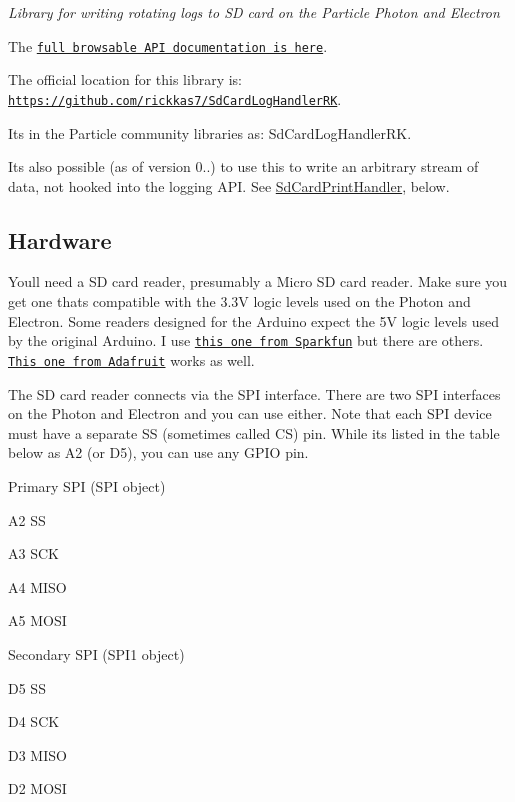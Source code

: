 {\itshape Library for writing rotating logs to SD card on the Particle Photon and Electron}

The \href{http://rickkas7.github.io/SdCardLogHandlerRK/}{\tt full browsable A\+PI documentation is here}.

The official location for this library is\+: \href{https://github.com/rickkas7/SdCardLogHandlerRK}{\tt https\+://github.\+com/rickkas7/\+Sd\+Card\+Log\+Handler\+RK}.

It\textquotesingle{}s in the Particle community libraries as\+: Sd\+Card\+Log\+Handler\+RK.

It\textquotesingle{}s also possible (as of version 0..) to use this to write an arbitrary stream of data, not hooked into the logging A\+PI. See \mbox{\hyperlink{class_sd_card_print_handler}{Sd\+Card\+Print\+Handler}}, below.

\subsection*{Hardware}

You\textquotesingle{}ll need a SD card reader, presumably a Micro SD card reader. Make sure you get one that\textquotesingle{}s compatible with the 3.\+3V logic levels used on the Photon and Electron. Some readers designed for the Arduino expect the 5V logic levels used by the original Arduino. I use \href{https://www.sparkfun.com/products/13743}{\tt this one from Sparkfun} but there are others. \href{https://www.adafruit.com/product/254}{\tt This one from Adafruit} works as well.

  The SD card reader connects via the S\+PI interface. There are two S\+PI interfaces on the Photon and Electron and you can use either. Note that each S\+PI device must have a separate SS (sometimes called CS) pin. While it\textquotesingle{}s listed in the table below as A2 (or D5), you can use any G\+P\+IO pin.

Primary S\+PI (S\+PI object)


\begin{DoxyItemize}
\item A2 SS
\item A3 S\+CK
\item A4 M\+I\+SO
\item A5 M\+O\+SI
\end{DoxyItemize}

Secondary S\+PI (S\+P\+I1 object)


\begin{DoxyItemize}
\item D5 SS
\item D4 S\+CK
\item D3 M\+I\+SO
\item D2 M\+O\+SI
\end{DoxyItemize}

